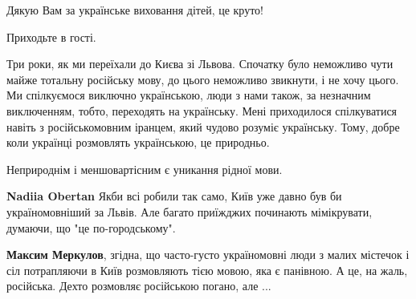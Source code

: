 \begin{itemize}
 
Дякую Вам за українське виховання дітей, це круто!

 
Приходьте в гості.

 

Три роки, як ми переїхали до Києва зі Львова. Спочатку було неможливо чути
майже тотальну російську мову, до цього неможливо звикнути, і не хочу цього. Ми
спілкуємося виключно українською, люди з нами також, за незначним виключенням,
тобто, переходять на українську. Мені приходилося спілкуватися навіть з
російськомовним іранцем, який чудово розуміє українську. Тому, добре коли
українці розмовлять українською, це природньо. 

Неприроднім і меншовартісним є уникання рідної мови.

\begin{itemize}
 
\textbf{Nadiia Obertan} Якби всі робили так само, Київ уже давно був би україномовніший за Львів. Але багато приїжджих починають мімікрувати, думаючи, що "це по-городському".

 
\textbf{Максим Меркулов}, згідна, що часто-густо україномовні люди з малих містечок і сіл потрапляючи в Київ розмовляють тією мовою, яка є панівною. А це, на жаль, російська. Дехто розмовляє російською погано, але ...
\end{itemize}


\end{itemize}
